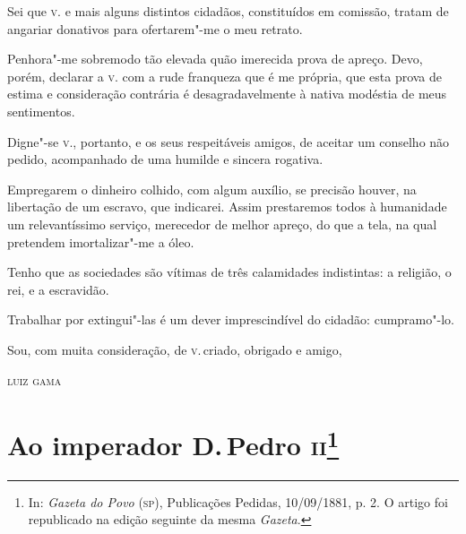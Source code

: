 \noindent{}Sei que \textsc{v}. e mais alguns distintos cidadãos, constituídos em comissão, tratam de angariar donativos para ofertarem"-me o meu retrato.

Penhora"-me sobremodo tão elevada quão imerecida prova de apreço. Devo,
porém, declarar a \textsc{v}. com a rude franqueza que é me própria, que esta
prova de estima e consideração contrária é desagradavelmente à nativa
modéstia de meus sentimentos.

Digne"-se \textsc{v}., portanto, e os seus respeitáveis amigos, de aceitar um
conselho não pedido, acompanhado de uma humilde e sincera rogativa.

Empregarem o dinheiro colhido, com algum auxílio, se precisão houver, na
libertação de um escravo, que indicarei. Assim prestaremos todos à
humanidade um relevantíssimo serviço, merecedor de melhor apreço, do que
a tela, na qual pretendem imortalizar"-me a óleo.

Tenho que as sociedades são vítimas de três calamidades indistintas: a
religião, o rei, e a escravidão.

Trabalhar por extingui"-las é um dever imprescindível do cidadão:
cumpramo"-lo.

Sou, com muita consideração, de \textsc{v}.\,criado, obrigado e amigo,\medskip

\hfill\textsc{luiz gama}

\chapter{Ao imperador D.\,Pedro \textsc{ii}\footnote[*]{In:
  \emph{Gazeta do Povo} (\textsc{sp}), Publicações Pedidas, 10/09/1881, p. 2. O
  artigo foi republicado na edição seguinte da mesma \emph{Gazeta}.}}

